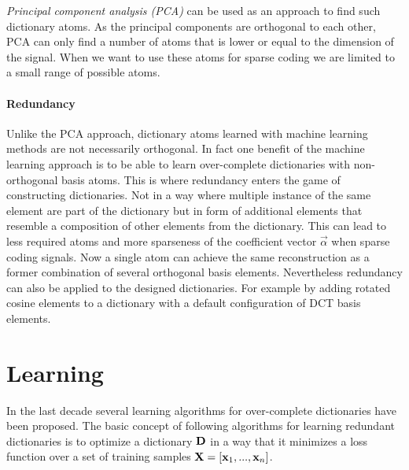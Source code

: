 \emph{Principal component analysis (PCA)} can be used as an approach to find
such dictionary atoms. As the principal components are orthogonal to each other,
PCA can only find a number of atoms that is lower or equal to the
dimension of the signal. When we want to use these atoms for sparse coding we
are limited to a small range of possible atoms.

\paragraph{Redundancy} Unlike the PCA approach,
dictionary atoms learned with machine learning methods are not necessarily
orthogonal. In fact one benefit of the machine learning approach is to be able
to learn over-complete dictionaries with non-orthogonal basis atoms. This is
where redundancy enters the game of constructing dictionaries. Not in a way
where multiple instance of the same element are part of the dictionary but in
form of additional elements that resemble a composition of other elements from
the dictionary. This can lead to less required atoms and more sparseness of the
coefficient vector $\vec{\alpha}$ when sparse coding signals. Now a single atom
can achieve the same reconstruction as a former combination of several
orthogonal basis elements. 
Nevertheless redundancy can also be applied to the designed
dictionaries. For example by adding rotated cosine elements to a dictionary with
a default configuration of DCT basis elements.


\section{Learning}
In the last decade several learning algorithms for over-complete dictionaries
have been proposed. 
The basic concept of following algorithms for learning
redundant dictionaries is to optimize a dictionary $\boldsymbol{\mathrm{D}}$ in a
way that it minimizes a loss function over a set of training samples
$\boldsymbol{\mathrm{X}}=[\boldsymbol{\mathrm{x}}_1,...,\boldsymbol{\mathrm{x}}_n]$.

